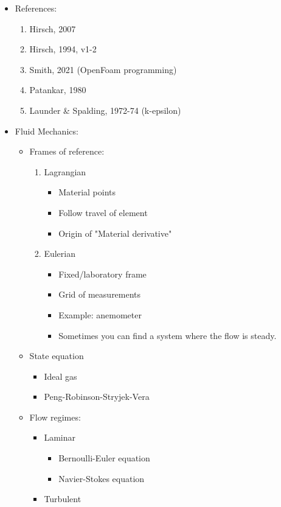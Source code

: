 \documentclass{article}
\begin{document}
\begin{itemize}
	\item References:
	\begin{enumerate}
		\item Hirsch, 2007
		\item Hirsch, 1994, v1-2
		\item Smith, 2021 (OpenFoam programming)
		\item Patankar, 1980
		\item Launder \& Spalding, 1972-74 (k-epsilon)
	\end{enumerate}
	\item Fluid Mechanics:
	\begin{itemize}
		\item Frames of reference:
		\begin{enumerate}
			\item Lagrangian
			\begin{itemize}
				\item Material points
				\item Follow travel of element
				\item Origin of "Material derivative"
			\end{itemize}
			\item Eulerian
			\begin{itemize}
				\item Fixed/laboratory frame
				\item Grid of measurements
				\item Example: anemometer
				\item Sometimes you can find a system where the flow is steady.
			\end{itemize}
		\end{enumerate}
		\item State equation
		\begin{itemize}
			\item Ideal gas
			\item Peng-Robinson-Stryjek-Vera
		\end{itemize}
		\item Flow regimes:
		\begin{itemize}
			\item Laminar
			\begin{itemize}
				\item Bernoulli-Euler equation
				\item Navier-Stokes equation
			\end{itemize}
			\item Turbulent

\end{itemize}
\end{itemize}
\end{itemize}
\end{document}
